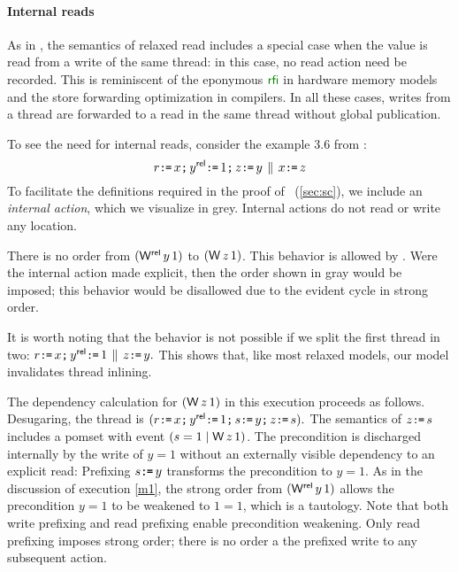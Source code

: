\paragraph{Internal reads}
As in \citep{2019-sp}, the semantics of relaxed read includes a special case
when the value is read from a write of the same thread: in this case, no read
action need be recorded.  This is reminiscent of the eponymous ${\rrfi}$ in hardware memory models and the store forwarding optimization in compilers.  In all these cases, writes from a thread are forwarded to a read in the same thread without global publication.  

To see the need for internal reads, consider the example 3.6 from
\cite{DBLP:journals/pacmpl/PodkopaevLV19}:
\begin{displaymath}
  r\texttt{:}\mkern-1mu\texttt{=}\, x\texttt{;}\,
  y^{\mathsf{rel}}\texttt{:}\mkern-1mu\texttt{=}\, 1\texttt{;}\,
  z\texttt{:}\mkern-1mu\texttt{=}\, y
  \,\mathbin{\|}\,
  x\texttt{:}\mkern-1mu\texttt{=}\, z
\end{displaymath}
To facilitate the definitions required in the proof
of \drfsc\ (\textsection\ref{sec:sc}), we include an \emph{internal action},
which we visualize in grey.  Internal actions do not read or write any
location.  
\begin{tikzdisplay}[node distance=1em]
\end{tikzdisplay}
There is no order from $(\DWRel{y}{1})$ to $(\DW{z}{1})$.  This behavior is
allowed by \armeight.  Were the internal action made explicit, then the order
shown in gray would be imposed; this behavior would be disallowed due to the
evident cycle in strong order.

It is worth noting that the behavior is not possible if we split the first
thread in two:
\begin{math}
  r\texttt{:}\mkern-1mu\texttt{=}\, x\texttt{;}\,
  y^{\mathsf{rel}}\texttt{:}\mkern-1mu\texttt{=}\, 1\,\mathbin{\|}\,
  z\texttt{:}\mkern-1mu\texttt{=}\, y.
\end{math}
This shows that, like most relaxed models, our model invalidates thread
inlining.

The dependency calculation for $(\DW{z}{1})$ in this execution proceeds as
follows.  Desugaring, the thread is
\begin{math}
  (r\texttt{:}\mkern-1mu\texttt{=}\, x\texttt{;}\,
  y^{\mathsf{rel}}\texttt{:}\mkern-1mu\texttt{=}\, 1\texttt{;}\,
  s\texttt{:}\mkern-1mu\texttt{=}\, y\texttt{;}\,
  z\texttt{:}\mkern-1mu\texttt{=}\, s).
\end{math}
The semantics of $z\texttt{:}\mkern-1mu\texttt{=}\, s$ includes a pomset with event
$(\bReg=1\mid \DW{z}{1})$. The precondition is discharged internally by the
write of $y=1$ without an externally visible dependency to an explicit read:
Prefixing $s\texttt{:}\mkern-1mu\texttt{=}\, y$ transforms the precondition to $y=1$.  As in the
discussion of execution \eqref{m1}, the strong order from $(\DWRel{y}{1})$
allows the precondition $y=1$ to be weakened to $1=1$, which is a tautology.
Note that both write prefixing and read prefixing enable precondition
weakening.  Only read prefixing imposes strong order; there is no order a
the prefixed write to any subsequent action.

